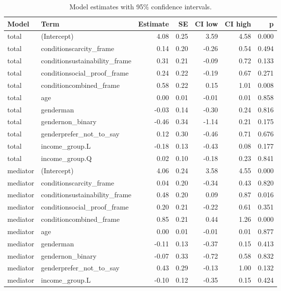 \begin{table}

\caption{\label{tab:models}Model estimates with 95\% confidence intervals.}
\centering
\begin{tabular}[t]{llrrrrr}
\toprule
Model & Term & Estimate & SE & CI low & CI high & p\\
\midrule
total & (Intercept) & 4.08 & 0.25 & 3.59 & 4.58 & 0.000\\
total & conditionscarcity\_frame & 0.14 & 0.20 & -0.26 & 0.54 & 0.494\\
total & conditionsustainability\_frame & 0.31 & 0.21 & -0.09 & 0.72 & 0.133\\
total & conditionsocial\_proof\_frame & 0.24 & 0.22 & -0.19 & 0.67 & 0.271\\
total & conditioncombined\_frame & 0.58 & 0.22 & 0.15 & 1.01 & 0.008\\
\addlinespace
total & age & 0.00 & 0.01 & -0.01 & 0.01 & 0.858\\
total & genderman & -0.03 & 0.14 & -0.30 & 0.24 & 0.816\\
total & gendernon\_binary & -0.46 & 0.34 & -1.14 & 0.21 & 0.175\\
total & genderprefer\_not\_to\_say & 0.12 & 0.30 & -0.46 & 0.71 & 0.676\\
total & income\_group.L & -0.18 & 0.13 & -0.43 & 0.08 & 0.177\\
\addlinespace
total & income\_group.Q & 0.02 & 0.10 & -0.18 & 0.23 & 0.841\\
mediator & (Intercept) & 4.06 & 0.24 & 3.58 & 4.55 & 0.000\\
mediator & conditionscarcity\_frame & 0.04 & 0.20 & -0.34 & 0.43 & 0.820\\
mediator & conditionsustainability\_frame & 0.48 & 0.20 & 0.09 & 0.87 & 0.016\\
mediator & conditionsocial\_proof\_frame & 0.20 & 0.21 & -0.22 & 0.61 & 0.351\\
\addlinespace
mediator & conditioncombined\_frame & 0.85 & 0.21 & 0.44 & 1.26 & 0.000\\
mediator & age & 0.00 & 0.01 & -0.01 & 0.01 & 0.877\\
mediator & genderman & -0.11 & 0.13 & -0.37 & 0.15 & 0.413\\
mediator & gendernon\_binary & -0.07 & 0.33 & -0.72 & 0.58 & 0.832\\
mediator & genderprefer\_not\_to\_say & 0.43 & 0.29 & -0.13 & 1.00 & 0.132\\
\addlinespace
mediator & income\_group.L & -0.10 & 0.12 & -0.35 & 0.15 & 0.424\\

\end{tabular}
\end{table}
